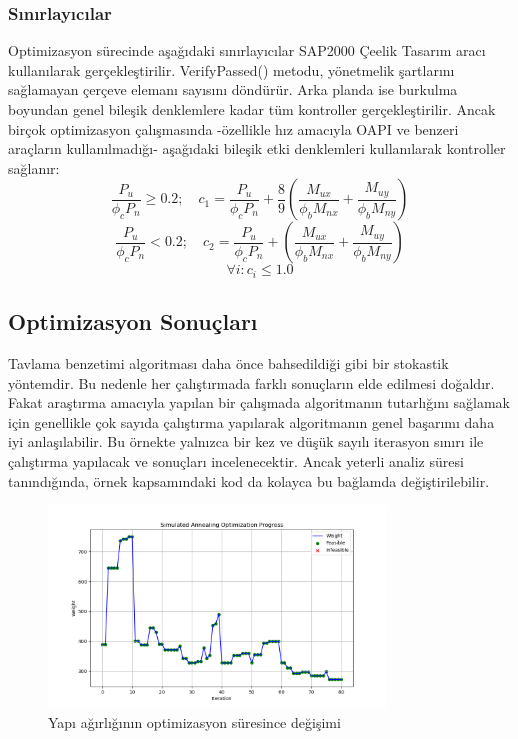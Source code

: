 \subsubsection{Sınırlayıcılar}
Optimizasyon sürecinde aşağıdaki sınırlayıcılar SAP2000 Çeelik Tasarım aracı kullanılarak gerçekleştirilir. VerifyPassed() metodu, yönetmelik şartlarını sağlamayan çerçeve elemanı sayısını döndürür. Arka planda ise burkulma boyundan genel bileşik denklemlere kadar tüm kontroller gerçekleştirilir. Ancak birçok optimizasyon çalışmasında -özellikle hız amacıyla OAPI ve benzeri araçların kullanılmadığı- aşağıdaki bileşik etki denklemleri kullanılarak kontroller sağlanır:
\begin{equation}
    \frac{P_u}{\phi_c P_n} \geq 0.2; \quad c_1=\frac{P_u}{\phi_c P_n} + \frac{8}{9} \left(\frac{M_{ux}}{\phi_b M_{nx}} + \frac{M_{uy}}{\phi_b M_{ny}}\right) 
\end{equation}
\begin{equation}
    \frac{P_u}{\phi_c P_n} < 0.2; \quad c_2=\frac{P_u}{\phi_c P_n} +  \left(\frac{M_{ux}}{\phi_b M_{nx}} + \frac{M_{uy}}{\phi_b M_{ny}}\right) 
\end{equation}
\begin{equation}
    \forall i: c_i \leq 1.0
\end{equation}

\subsection{Optimizasyon Sonuçları}
Tavlama benzetimi algoritması daha önce bahsedildiği gibi bir stokastik yöntemdir. Bu nedenle her çalıştırmada farklı sonuçların elde edilmesi doğaldır. Fakat araştırma amacıyla yapılan bir çalışmada algoritmanın tutarlığını sağlamak için genellikle çok sayıda çalıştırma yapılarak algoritmanın genel başarımı daha iyi anlaşılabilir. Bu örnekte yalnızca bir kez ve düşük sayılı iterasyon sınırı ile çalıştırma yapılacak ve sonuçları incelenecektir. Ancak yeterli analiz süresi tanındığında, örnek kapsamındaki kod da kolayca bu bağlamda değiştirilebilir.

\begin{figure}[H]
    \centering
    \includegraphics[width=0.8\textwidth]{weeks_new/imgs/exmp7_fig4.png}
    \caption{Yapı ağırlığının optimizasyon süresince değişimi}
    \label{fig:weight_change}
\end{figure}

